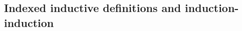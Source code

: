\documentclass{article}
\begin{document}




\subsection{Indexed inductive definitions and induction-induction}
\label{sec:indexed-induction}






\end{document}
